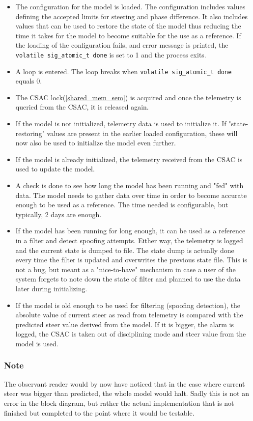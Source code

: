 \documentclass[12pt,english,a4paper]{report}
\begin{document}
\begin{itemize}
  \item The configuration for the model is loaded. The configuration includes values defining the accepted limits for steering and phase difference. It also includes values that can be used to restore the state of the model thus reducing the time it takes for the model to become suitable for the use as a reference. If the loading of the configuration fails, and error message is printed, the \texttt{volatile sig\_atomic\_t done} is set to 1 and the process exits.
  \item A loop is entered. The loop breaks when \texttt{volatile sig\_atomic\_t done} equals 0. 
  \item The CSAC lock(\ref{shared_mem_sem}) is acquired and once the telemetry is queried from the CSAC, it is released again.
  \item If the model is not initialized, telemetry data is used to initialize it. If "state-restoring" values are present in the earlier loaded configuration, these will now also be used to initialize the model even further.
  \item If the model is already initialized, the telemetry received from the CSAC is used to update the model. 
  \item A check is done to see how long the model has been running and "fed" with data. The model needs to gather data over time in order to become accurate enough to be used as a reference. The time needed is configurable, but typically, 2 days are enough. 
  \item If the model has been running for long enough, it can be used as a reference in a filter and detect spoofing attempts. Either way, the telemetry is logged and the current state is dumped to file. The state dump is actually done every time the filter is updated and overwrites the previous state file. This is not a bug, but meant as a "nice-to-have" mechanism in case a user of the system forgets to note down the state of filter and planned to use the data later during initializing. 
  \item If the model is old enough to be used for filtering (spoofing detection), the absolute value of current steer as read from telemetry is compared with the predicted steer value derived from the model. If it is bigger, the alarm is logged, the CSAC is taken out of disciplining mode and steer value from the model is used.
\end{itemize}

\subsubsection{Note}
The observant reader would by now have noticed that in the case where current steer was bigger than predicted, the whole model would halt. Sadly this is not an error in the block diagram, but rather the actual implementation that is not finished but completed to the point where it would be testable.  
\end{document}
